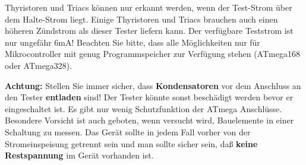 Thyristoren und Triacs können nur erkannt werden, wenn der Test-Strom über dem Halte-Strom liegt.
Einige Thyristoren und Triacs brauchen auch einen höheren Zündstrom als dieser Tester liefern kann.
Der verfügbare Teststrom ist nur ungefähr 6mA!
Beachten Sie bitte, dass alle Möglichkeiten nur für Mikrocontroller mit genug Programmspeicher zur Verfügung stehen (ATmega168 oder ATmega328).

\vspace{1cm}
\textbf{{\Large Achtung:}} Stellen Sie immer sicher, dass {\bf Kondensatoren} vor dem Anschluss an den Tester {\bf entladen} sind!
Der Tester könnte sonst beschädigt werden bevor er eingeschaltet ist.
Es gibt nur wenig Schutzfunktion der ATmega Anschlüsse.
Besondere Vorsicht ist auch geboten, wenn versucht wird, Bauelemente in einer Schaltung zu messen.
Das Gerät sollte in jedem Fall vorher von der Strom\-ein\-spei\-sung getrennt sein und man sollte sicher sein,
daß {\bf keine Restspannung} im Gerät vorhanden ist.


